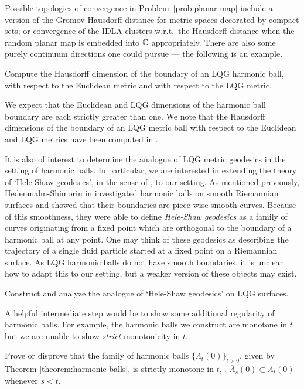 \documentclass[12pt]{amsart}
\numberwithin{equation}{section}
\begin{document}
	Possible topologies of convergence in Problem~\ref{prob:planar-map} include a version of the Gromov-Hausdorff distance for metric spaces decorated by compact sets; or convergence of the IDLA clusters w.r.t.\ the Hausdorff distance when the random planar map is embedded into $\mathbb{C}$ appropriately.
	There are also some purely continuum directions one could pursue --- the following is an example.
	
	
	\begin{problem} \label{prob:boundary-dim}
		Compute the Hausdorff dimension of the boundary of an LQG harmonic ball, with respect to the Euclidean metric and with respect to the LQG metric.
	\end{problem}
	
	We expect that the Euclidean and LQG dimensions of the harmonic ball boundary are each strictly greater than one. We note that the Hausdorff dimensions of the boundary of an LQG metric ball with respect to the Euclidean and LQG metrics have been computed in \cite{gwynne-dimension-metric-ball, MR4408506}. 
	
	It is also of interest to determine the analogue of LQG metric geodesics in 
	the setting of harmonic balls. In particular, we are interested in extending the theory of `Hele-Shaw geodesics', in the sense of 
	\cite{hedenmalm2002hele}, to our setting. As mentioned previously, Hedenmalm-Shimorin in \cite{hedenmalm2002hele} investigated harmonic balls on smooth Riemannian surfaces
	and showed that their boundaries are piece-wise smooth curves. Because of this smoothness, they were able to define
	{\it Hele-Shaw geodesics} as a family of curves originating from a fixed point which are orthogonal to the boundary of a harmonic ball at any point. 
	One may think of these geodesics as describing the trajectory of a single fluid particle started at a fixed point on a Riemannian surface. 
	As LQG harmonic balls do not have smooth boundaries, it is unclear how to adapt this to our setting, but 
	a weaker version of these objects may exist. 
	\begin{problem}
		Construct and analyze the analogue of `Hele-Shaw geodesics' \cite{hedenmalm2002hele} on LQG surfaces. 
	\end{problem}
	
	
	
	A helpful intermediate step would be to show some additional regularity of harmonic balls. For example, the harmonic balls
	we construct are monotone in $t$ but we are unable to show {\it strict} monotonicity in $t$. 
	\begin{problem}
		Prove or disprove that the family of harmonic balls $\{\Lambda_t(0)\}_{t>0}$, given by Theorem \ref{theorem:harmonic-balls},  is strictly monotone in $t$, \ie, $\overline{\Lambda}_s(0) \subset \Lambda_t(0)$ whenever $s < t$. 
	\end{problem}
	
\end{document}
